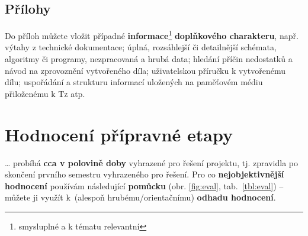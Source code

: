 \documentclass[a4paper,11pt, twoside]{report}
\begin{document}
\section{Přílohy}


\thispagestyle{fancy}

Do příloh můžete vložit případné \textbf{informace}\footnote{smysluplné a k tématu relevantní} \textbf{doplňkového charakteru}, např. výtahy z technické dokumentace; úplná, rozsáhlejší či detailnější schémata, algoritmy či programy, nezpracovaná a hrubá data; hledání příčin nedostatků a 
návod na zprovoznění vytvořeného díla; uživatelskou příručku k vytvořenému dílu; uspořádání a strukturu informací uložených na paměťovém médiu přiloženému k \textsc{Tz} atp.



\pagebreak



\appendix

\thispagestyle{fancy}


\chapter{Hodnocení přípravné etapy}

\label{chapt:eval}

\raggedbottom

\vspace{-8mm}

\ldots
probíhá \textbf{cca v polovině doby} vyhrazené pro řešení projektu, 
tj. zpravidla po skončení prvního semestru vyhrazeného pro řešení.
Pro co \textbf{nejobjektivnější hodnocení} používám následující \textbf{pomůcku}
(obr. \ref{fig:eval}, tab.~\ref{tbl:eval}) 
-- můžete ji využít  k~(alespoň hrubému/orientačnímu) \textbf{odhadu hodnocení}.

\thispagestyle{fancy}
\end{document}
